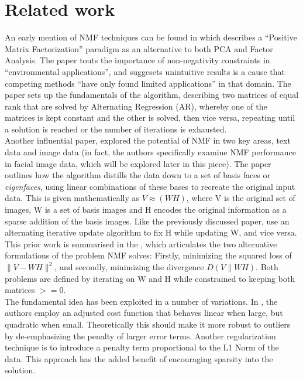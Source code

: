 \documentclass{article} %
\begin{document}
\section{Related work}
An early mention of NMF techniques can be found in \cite{paatero1994} which describes a ``Positive Matrix Factorization'' paradigm as an alternative to both PCA and Factor Analysis. The paper touts the importance of non-negativity constraints in ``environmental applications'', and suggesets unintuitive results is a cause that competing methods ``have only found limited applications'' in that domain. The paper sets up the fundamentals of the algorithm, describing two matrices of equal rank that are solved by Alternating Regression (AR), whereby one of the matrices is kept constant and the other is solved, then vice versa, repeating until a solution is reached or the number of iterations is exhausted.\\

Another influential paper, \cite{lee99} explored the potential of NMF in two key areas, text data and image data (in fact, the authors specifically examine NMF performance in facial image data, which will be explored later in this piece). The paper outlines how the algorithm distills the data down to a set of basis faces or \textit{eigenfaces}, using linear combinations of these bases to recreate the original input data. This is given mathematically as \(V \approx (WH)\), where V is the original set of images, W is a set of basis images and H encodes the original information as a sparse addition of the basis images. Like the previously discussed paper, \cite{lee99} use an alternating iterative update algorithm to fix H while updating W, and vice versa.\\

This prior work is summarised in the \cite{NIPS2000_1861}, which articulates the two alternative formulations of the problem NMF solves: Firstly, minimizing the squared loss of $\|V - WH\|^2$, and secondly, minimizing the divergence $D(V\|WH)$. Both problems are defined  by iterating on W and H while constrained to keeping both matrices $>=0$. \\

The fundamental idea has been exploited in a number of variations. In \cite{Hamza2006}, the authors employ an adjusted cost function that behaves linear when large, but quadratic when small. Theoretically this should make it more robust to outliers by de-emphasizing the penalty of larger error terms. Another regularization technique is to introduce a penalty term proportional to the L1 Norm of the data. This approach has the added benefit of encouraging sparsity into the solution.\\
\end{document}
